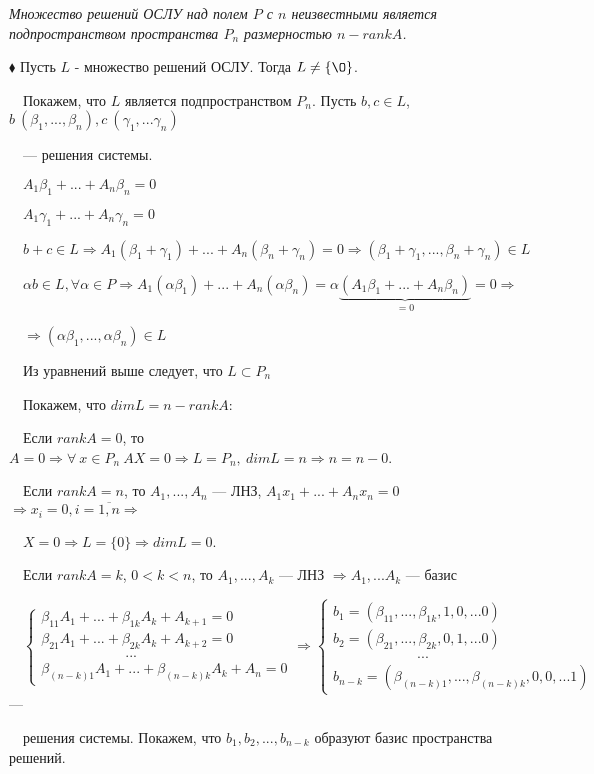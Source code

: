 \documentclass[a4paper, 12pt]{report}
\begin{document}
	\textit{Множество решений ОСЛУ над полем $P$ с $n$ неизвестными является подпространством пространства $P_n$ размерностью $n-rankA$.}
	\par\bigskip
	$\blacklozenge$ Пусть $L$ - множество решений ОСЛУ. Тогда $L\ne \{\O\}$.
	
	$\quad$Покажем, что $L$ является подпространством $P_n$. Пусть $b,c\in L$,\  $b\ (\beta_1,...,\beta_n), c\ (\gamma_1,...\gamma_n)$ 
	
	$\quad$--- решения системы.
	
	$\quad A_1\beta_1 + ... + A_n\beta_n = 0$
	
	$\quad A_1\gamma_1 + ... + A_n\gamma_n = 0$
	
	$\quad b+c\in L \Rightarrow A_1(\beta_1 + \gamma_1)+...+A_n(\beta_n + \gamma_n) = 0 \Rightarrow (\beta_1 + \gamma_1, ..., \beta_n + \gamma_n)\in L$
	
	$\quad \alpha b \in L, \forall \alpha \in P \Rightarrow A_1(\alpha \beta_1) + ... + A_n(\alpha \beta_n) = \alpha \underbrace{( A_1 \beta_1 + ... + A_n\beta_n)}_{=0} = 0\Rightarrow$
	
	$\quad \Rightarrow (\alpha \beta_1, ..., \alpha \beta_n)\in L$ 
	
	$\quad$Из уравнений выше следует, что $L\subset P_n$
	
	$\quad$Покажем, что $dim L = n - rank A$:
	
	$\quad$Если $rankA = 0 $, то $A = 0\Rightarrow \forall \ x\in P_n \ AX = 0 \Rightarrow L = P_n,\ dimL = n \Rightarrow n=n-0$.
	
	$\quad$Если $rankA = n$, то $A_1,...,A_n$ --- ЛНЗ, $A_1 x_1 + ... + A_n x_n = 0$ $\Rightarrow x_i = 0, i = \overline{1,n} \Rightarrow $
	
	$\quad X = 0 \Rightarrow L=\{0\} \Rightarrow dimL = 0$.
	
	$\quad$Если $rankA = k$, $0<k<n$, то $A_1,...,A_k$ --- ЛНЗ $\Rightarrow A_1,...A_k$ --- базис   
	\par\bigskip
	$\quad\begin{cases}
		\beta_{11}A_1+...+\beta_{1k}A_k + A_{k+1}=0 \\
		\beta_{21}A_1+...+\beta_{2k}A_k + A_{k+2}=0 \\
		\qquad\qquad\qquad...\\
		\beta_{(n-k)1}A_1+...+\beta_{(n-k)k}A_k + A_n=0
	\end{cases} \Rightarrow
	\begin{cases}
		b_1 = (\beta_{11},...,\beta_{1k},1,0,...0) \\
		b_2 = (\beta_{21},...,\beta_{2k},0,1,...0) \\
		\qquad\qquad\qquad...\\
		b_{n-k} = (\beta_{(n-k)1},...,\beta_{(n-k)k},0,0,...1)
	\end{cases}  $ --- 
	\par\bigskip
	$\quad$решения системы. Покажем, что $b_1,b_2,...,b_{n-k}$ образуют базис пространства решений. 
	
\end{document}
